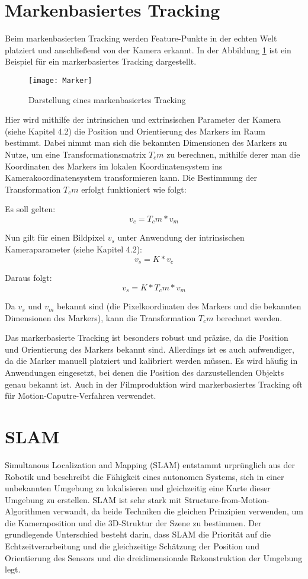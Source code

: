 \section{Markenbasiertes Tracking}

Beim markenbasierten Tracking werden Feature-Punkte in der echten Welt platziert und anschließend von der Kamera erkannt. In der Abbildung \ref{fig:Marker} ist ein Beispiel für ein markerbasiertes Tracking dargestellt. 

\begin{figure}
    \centering
    \texttt{[image: Marker]}
    \caption{Darstellung eines markenbasiertes Tracking\label{fig:Marker}}\par
\end{figure}

Hier wird mithilfe der intrinsichen und extrinsischen Parameter der Kamera (siehe Kapitel 4.2) die Position und Orientierung des Markers im Raum bestimmt. Dabei nimmt man sich die bekannten Dimensionen des Markers zu Nutze, um eine Transformationsmatrix \(T_cm\) zu berechnen, mithilfe derer man die Koordinaten des Markers im lokalen Koordinatensystem ins Kamerakoordinatensystem transformieren kann. Die Bestimmung der Transformation \(T_cm\) erfolgt funktioniert wie folgt:

Es soll gelten:
\[ v_c = T_cm * v_m \]

Nun gilt für einen Bildpixel \(v_s\) unter Anwendung der intrinsischen Kameraparameter (siehe Kapitel 4.2):
\[ v_s = K * v_c \]

Daraus folgt:
\[ v_s = K * T_cm * v_m \]

Da \(v_s\) und \(v_m\) bekannt sind (die Pixelkoordinaten des Markers und die bekannten Dimensionen des Markers), kann die Transformation \(T_cm\) berechnet werden.

Das markerbasierte Tracking ist besonders robust und präzise, da die Position und Orientierung des Markers bekannt sind. Allerdings ist es auch aufwendiger, da die Marker manuell platziert und kalibriert werden müssen. Es wird häufig in Anwendungen eingesetzt, bei denen die Position des darzustellenden Objekts genau bekannt ist. Auch in der Filmproduktion wird markerbasiertes Tracking oft für Motion-Caputre-Verfahren verwendet.

\section{SLAM}

Simultanous Localization and Mapping (SLAM) entstammt urprünglich aus der Robotik und beschreibt die Fähigkeit eines autonomen Systems, sich in einer unbekannten Umgebung zu lokalisieren und gleichzeitig eine Karte dieser Umgebung zu erstellen. SLAM ist sehr stark mit Structure-from-Motion-Algorithmen verwandt, da beide Techniken die gleichen Prinzipien verwenden, um die Kameraposition und die 3D-Struktur der Szene zu bestimmen. Der grundlegende Unterschied besteht darin, dass SLAM die Priorität auf die Echtzeitverarbeitung und die gleichzeitige Schätzung der Position und Orientierung des Sensors und die dreidimensionale Rekonstruktion der Umgebung legt. 

